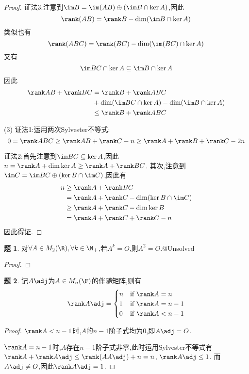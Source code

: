 \documentclass{article}
\theoremstyle{definition}
\newtheorem{exercise}{题}[section]
\begin{document}
\begin{proof}
    证法3:注意到$\im B=\im (AB)\oplus(\im B\cap \ker A)$,因此$$\rank (AB)=\rank B-\dim(\im B\cap \ker A)$$
    类似也有$$\rank (ABC)=\rank(BC)-\dim(\im(BC)\cap \ker A)$$
    又有$$\im BC\cap \ker A\subseteq \im B\cap \ker A$$
    因此$$\begin{aligned}
        \rank AB+\rank BC&=\rank B+\rank ABC\\&+\dim(\im BC\cap \ker A)-\dim(\im B\cap \ker A)\\ &\leq \rank B+\rank ABC
    \end{aligned}$$

    (3) 证法1:运用两次Sylvester不等式:$$0=\rank ABC\geq \rank AB+\rank C-n\geq \rank A+\rank B+\rank C-2n$$

    证法2:首先注意到$\im BC\subseteq \ker A$,因此$n=\rank A+\dim \ker A\geq \rank A+\rank BC$.
    其次,注意到$\im C=\im BC\oplus (\ker B\cap \im C)$,因此有
    $$\begin{aligned}
        n&\geq \rank A+\rank BC\\&=\rank A+\rank C-\dim (\ker B\cap \im C)\\&\geq \rank A+\rank C-\dim \ker B\\&=\rank A+\rank C+\rank C-n
    \end{aligned}$$
    因此得证.
\end{proof}

\begin{exercise}
    对$\forall A\in M_2(\R), \forall k\in \N_+$,若$A^k=O$,则$A^2=O$.@Unsolved
\end{exercise}
\begin{proof}
    
\end{proof}

\begin{exercise}\label{adjmat1}
    记$A\adj$为$A\in M_n(\F)$的伴随矩阵,则有
    $$\rank A\adj=\begin{cases}
    n&\text{if } \rank A=n\\
    1&\text{if } \rank A=n-1\\
    0&\text{if } \rank A<n-1
    \end{cases}$$
\end{exercise}
\begin{proof}
    $\rank A<n-1$时,$A$的$n-1$阶子式均为0,即$A\adj=O$.

    $\rank A=n-1$时,$A$存在$n-1$阶子式非零,此时运用Sylvester不等式有$\rank A+\rank A\adj\leq \rank (AA\adj)+n=n$, $\rank A\adj\leq 1$.
    而$A\adj\neq O$,因此$\rank A\adj=1$.
\end{proof}
\end{document}
